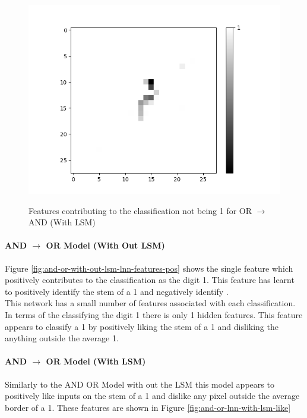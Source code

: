 \begin{minipage}[t]{0.45\textwidth}
\begin{figure}[H]
\begin{minipage}[b]{0.32\textwidth}
			\includegraphics[width=\textwidth]{OR-AND(W-LSM)(1)/DontLike/False/Layer0-Neuron-28.png}
			\label{}
		\end{minipage}
			\caption{Features contributing to the classification not being 1 for OR $\rightarrow$ AND (With LSM)}
			\label{fig:or-and-with-lsm-neg}
			\hfill
	\end{figure}
	
	\paragraph{AND $\rightarrow$ OR Model (With Out LSM)}
	Figure \ref{fig:and-or-with-out-lsm-lnn-features-pos} shows the single feature which positively contributes to the classification as the digit 1. This feature has learnt to positively identify the stem of a 1 and negatively identify .\\
		
	This network has a small number of features associated with each classification. In terms of the classifying the digit 1 there is only 1 hidden features. This feature appears to classify a 1 by positively liking the stem of a 1 and disliking the anything outside the average 1.\\
		
	\paragraph{AND $\rightarrow$ OR Model (With LSM)}
	Similarly to the AND OR Model with out the LSM this model appears to positively like inputs on the stem of a 1 and dislike any pixel outside the average border of a 1. These features are shown in Figure \ref{fig:and-or-lnn-with-lsm-like}
\end{minipage}
